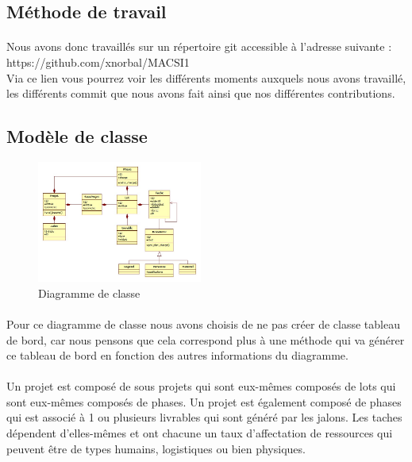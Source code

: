 \documentclass[a4paper, 12pt]{article}
\begin{document}
\subsection{Méthode de travail}
\paragraph{}Nous avons donc travaillés sur un répertoire git accessible à l'adresse suivante : \\ https://github.com/xnorbal/MACSI1  \\
Via ce lien vous pourrez voir les différents moments auxquels nous avons travaillé, les différents commit que nous avons fait ainsi que nos différentes contributions.

\subsection{Modèle de classe}

\begin{figure}[h!]
	\centering
	\includegraphics[height=4cm]{diagramme_de_classe.jpg}
	\caption{Diagramme de classe}
\end{figure}
\paragraph{}Pour ce diagramme de classe nous avons choisis de ne pas créer de classe tableau de bord, car nous pensons que cela correspond plus à une méthode qui va générer ce tableau de bord en fonction des autres informations du diagramme.
\paragraph{}Un projet est composé de sous projets qui sont eux-mêmes composés de lots qui sont eux-mêmes composés de phases. Un projet est également composé de phases qui est associé à 1 ou plusieurs livrables qui sont généré par les jalons. Les taches dépendent d'elles-mêmes et ont chacune un taux d'affectation de ressources qui peuvent être de types humains, logistiques ou bien physiques.
\end{document}
